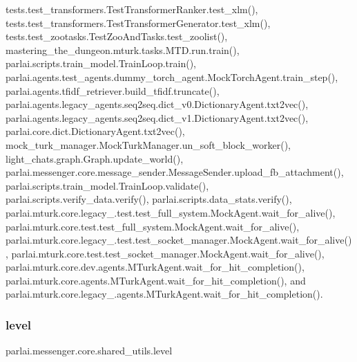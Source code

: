 tests.\+test\+\_\+transformers.\+Test\+Transformer\+Ranker.\+test\+\_\+xlm(), tests.\+test\+\_\+transformers.\+Test\+Transformer\+Generator.\+test\+\_\+xlm(), tests.\+test\+\_\+zootasks.\+Test\+Zoo\+And\+Tasks.\+test\+\_\+zoolist(), mastering\+\_\+the\+\_\+dungeon.\+mturk.\+tasks.\+M\+T\+D.\+run.\+train(), parlai.\+scripts.\+train\+\_\+model.\+Train\+Loop.\+train(), parlai.\+agents.\+test\+\_\+agents.\+dummy\+\_\+torch\+\_\+agent.\+Mock\+Torch\+Agent.\+train\+\_\+step(), parlai.\+agents.\+tfidf\+\_\+retriever.\+build\+\_\+tfidf.\+truncate(), parlai.\+agents.\+legacy\+\_\+agents.\+seq2seq.\+dict\+\_\+v0.\+Dictionary\+Agent.\+txt2vec(), parlai.\+agents.\+legacy\+\_\+agents.\+seq2seq.\+dict\+\_\+v1.\+Dictionary\+Agent.\+txt2vec(), parlai.\+core.\+dict.\+Dictionary\+Agent.\+txt2vec(), mock\+\_\+turk\+\_\+manager.\+Mock\+Turk\+Manager.\+un\+\_\+soft\+\_\+block\+\_\+worker(), light\+\_\+chats.\+graph.\+Graph.\+update\+\_\+world(), parlai.\+messenger.\+core.\+message\+\_\+sender.\+Message\+Sender.\+upload\+\_\+fb\+\_\+attachment(), parlai.\+scripts.\+train\+\_\+model.\+Train\+Loop.\+validate(), parlai.\+scripts.\+verify\+\_\+data.\+verify(), parlai.\+scripts.\+data\+\_\+stats.\+verify(), parlai.\+mturk.\+core.\+legacy\+\_.\+test.\+test\+\_\+full\+\_\+system.\+Mock\+Agent.\+wait\+\_\+for\+\_\+alive(), parlai.\+mturk.\+core.\+test.\+test\+\_\+full\+\_\+system.\+Mock\+Agent.\+wait\+\_\+for\+\_\+alive(), parlai.\+mturk.\+core.\+legacy\+\_.\+test.\+test\+\_\+socket\+\_\+manager.\+Mock\+Agent.\+wait\+\_\+for\+\_\+alive(), parlai.\+mturk.\+core.\+test.\+test\+\_\+socket\+\_\+manager.\+Mock\+Agent.\+wait\+\_\+for\+\_\+alive(), parlai.\+mturk.\+core.\+dev.\+agents.\+M\+Turk\+Agent.\+wait\+\_\+for\+\_\+hit\+\_\+completion(), parlai.\+mturk.\+core.\+agents.\+M\+Turk\+Agent.\+wait\+\_\+for\+\_\+hit\+\_\+completion(), and parlai.\+mturk.\+core.\+legacy\+\_.\+agents.\+M\+Turk\+Agent.\+wait\+\_\+for\+\_\+hit\+\_\+completion().

\mbox{\label{namespaceparlai_1_1messenger_1_1core_1_1shared__utils_a99fb4611391707176393ddf07d4af7d5}} 
\subsubsection{\texorpdfstring{level}{level}}
{\footnotesize\ttfamily parlai.\+messenger.\+core.\+shared\+\_\+utils.\+level}



